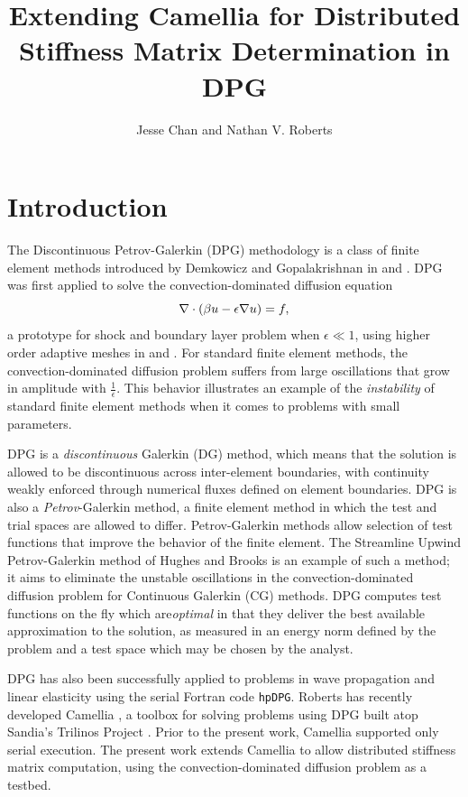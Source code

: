 \documentclass{article}
\date{}
\author{Jesse Chan and Nathan V. Roberts}
\title{Extending Camellia for Distributed Stiffness Matrix Determination in DPG}
\begin{document}
\maketitle

\section{Introduction}

The Discontinuous Petrov-Galerkin (DPG) methodology is a class of finite element methods introduced by Demkowicz and Gopalakrishnan in \cite{DPG1} and \cite{DPG2}. DPG was first applied to solve the convection-dominated diffusion equation
\[
\div \left(\beta u - \epsilon\grad u\right) = f,
\]
a prototype for shock and boundary layer problem when $\epsilon \ll 1$, using higher order adaptive meshes in \cite{DPG2} and \cite{DPG3}. For standard finite element methods, the convection-dominated diffusion problem suffers from large oscillations that grow in amplitude with $\frac{1}{\epsilon}$. This behavior illustrates an example of the \emph{instability} of standard finite element methods when it comes to problems with small parameters.
 
DPG is a \emph{discontinuous} Galerkin (DG) method, which means that the solution is allowed to be discontinuous across inter-element boundaries, with continuity weakly enforced through numerical fluxes defined on element boundaries. DPG is also a \emph{Petrov}-Galerkin method, a finite element method in which the test and trial spaces are allowed to differ. Petrov-Galerkin methods allow selection of test functions that improve the behavior of the finite element. The Streamline Upwind Petrov-Galerkin method of Hughes and Brooks \cite{SUPG} is an example of such a method; it aims to eliminate the unstable oscillations in the convection-dominated diffusion problem for Continuous Galerkin (CG) methods.  DPG computes test functions on the fly which are\emph{optimal} in that they deliver the best available approximation to the solution, as measured in an energy norm defined by the problem and a test space which may be chosen by the analyst.

DPG has also been successfully applied to problems in wave propagation and linear elasticity \cite{DPG4,DPGElas} using the serial Fortran code \verb+hpDPG+.  Roberts has recently developed Camellia \cite{Camellia}, a toolbox for solving problems using DPG built atop Sandia's Trilinos Project \cite{Trilinos-Overview}.  Prior to the present work, Camellia supported only serial execution.  The present work extends Camellia to allow distributed stiffness matrix computation, using the convection-dominated diffusion problem as a testbed. 
\end{document}
